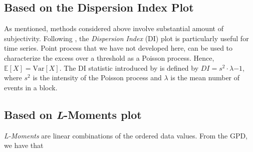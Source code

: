 




\subsection*{Based on the Dispersion Index Plot}

As mentioned, methods considered above involve substantial amount of subjectivity.
Following \citet{ribatet_users_2006}, the \emph{Dispersion Index} (DI) plot is particularly useful for time series. Point process that we have not developed here, can be used to characterize the excess over a threshold as a Poisson process. Hence, $\mathbb{E}[X]=\text{Var}[X]$. The DI statistic introduced by \cite{cunnane_note_1979} is 
defined by $DI=s^2\cdot\lambda{-1}$, where $s^2$ is the intensity of the Poisson process and $\lambda$ is the mean number of events in a block.


\subsection*{Based on \emph{L}-Moments plot}

\emph{L-Moments} are linear combinations of the ordered data values. 
From the GPD, we have that

